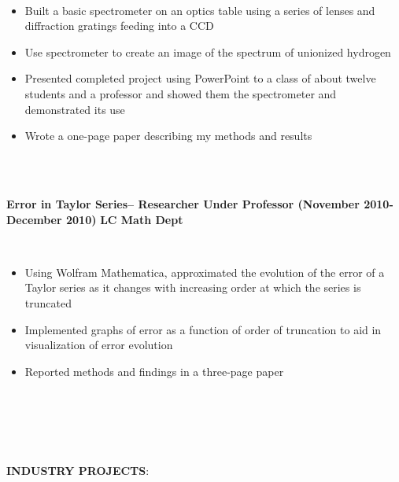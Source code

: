 \documentclass{article}
\begin{document}
\phantom \\
\begin{itemize}
\item Built a basic spectrometer on an optics table using a series of lenses and diffraction gratings feeding into a CCD
\item Use spectrometer to create an image of the spectrum of unionized hydrogen
\item Presented completed project using PowerPoint to a class of about twelve students and a professor and showed them the spectrometer and demonstrated its use
\item Wrote a one-page paper describing my methods and results
\end{itemize}
\phantom \\
\phantom \\
%
%
%
%
\begin{vwcol}[widths={0.8,0.2}, sep=.8cm, justify=flush, rule=0pt, indent=0em]
\noindent \textbf{Error in Taylor Series– Researcher Under Professor (November 2010-December 2010)}
\newpage
\noindent \textbf{LC Math Dept}
\end{vwcol}
\phantom \\
\begin{itemize}
\item Using Wolfram Mathematica, approximated the evolution of the error of a Taylor series as it changes with increasing order at which the series is truncated
\item Implemented graphs of error as a function of order of truncation to aid in visualization of error evolution
\item Reported methods and findings in a three-page paper
\end{itemize}
\phantom \\
\phantom \\
%
%
%
%
\par
\phantom \\
\phantom \\
\noindent \textbf{INDUSTRY PROJECTS}: \\
\end{document}

